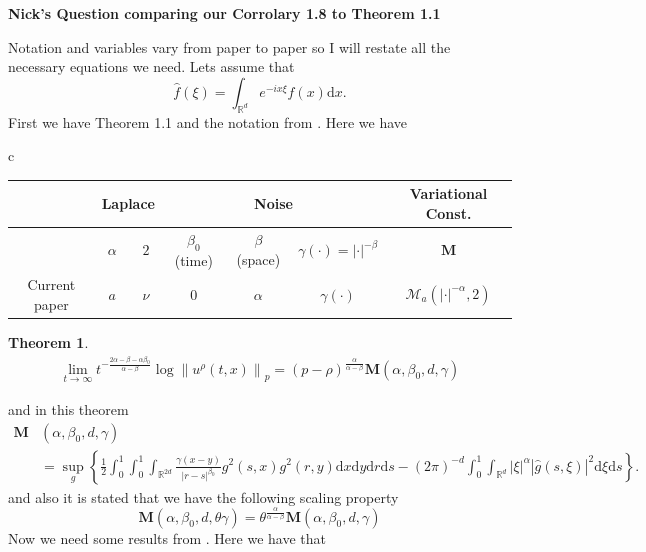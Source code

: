 \documentclass[a4paper,11pt]{article}
\numberwithin{equation}{section}
\theoremstyle{plain}
\newtheorem{theorem}{Theorem}[section]
\theoremstyle{definition}
\newcommand{\ud}{\ensuremath{\mathrm{d} }}
\newcommand{\Norm}[1]{\left\|  #1   \right\|}
\newcommand{\R}{\mathbb{R}}
\newcounter{NQ}
\newenvironment{NickQuestion}[1][] %
{\refstepcounter{NQ}
	\begin{mdframed}[backgroundcolor=lightgray]\textbf{Nick's Question \theNQ \: #1~~}~~~\noindent}%
	{\end{mdframed}}
\numberwithin{NQ}{section}
\numberwithin{LQ}{section}
\numberwithin{ZQ}{section}
\begin{document}
	\begin{NickQuestion}[comparing our Corrolary 1.8 to \cite{CHSS18} Theorem 1.1]

Notation and variables vary from paper to paper so I will restate all the necessary equations we need. Lets assume that
	\[
		\hat{f}(\xi) = \int_{\R^d} e^{-i x \xi}f(x) \ud x.
	\]
First we have Theorem 1.1 and the notation from \cite{CHSS18}. Here we have

	\begin{tabular}{c}
		\renewcommand{\arraystretch}{1.2}
		\begin{tabular}{|c|c|c|c|c|c|c|}
			\hline
			& \multicolumn{2}{c|}{Laplace} & \multicolumn{3}{c|}{Noise}    & Variational Const.  \\ \hline
			\cite{CHSS18}  & $\alpha$                      & $2$                        &  $\beta_0$ (time) & $\beta$ (space) & $\gamma(\cdot)=|\cdot|^{-\beta}$    & $\textbf{M}$                                \\
			Current paper                 & $a$                          & $\nu$           &      0     & $\alpha$ & $\gamma(\cdot)$                  & $\mathcal{M}_a\left(|\cdot|^{-\alpha},2\right)$ \\ \hline
		\end{tabular}
	\end{tabular}


	\begin{theorem}
		\begin{align*}
			\lim_{t \to \infty} t^{-\frac{2\alpha - \beta - \alpha \beta_0}{\alpha - \beta}} \log \Norm{u^{\rho}(t,x)}_p = (p-\rho)^{\frac{\alpha}{\alpha-\beta}}\textbf{M}(\alpha,\beta_0,d,\gamma)
		\end{align*}
	\end{theorem}
and in this theorem
		\begin{align*}
			\textbf{M} & (\alpha, \beta_0, d, \gamma)
			\\& = \sup_{g} \left\{ \frac{1}{2} \int_0^1 \int_0^1 \int_{\R^{2d}} \frac{\gamma(x-y)}{|r-s|^{\beta_0}} g^2(s,x)g^2(r,y) \ud x \ud y \ud r \ud s - (2\pi)^{-d}\int_0^1 \int_{\R^d} |\xi|^\alpha |\hat{g}(s,\xi)|^2 \ud \xi \ud s  \right\}.
		\end{align*}
and also it is stated that we have the following scaling property
	\[
		\textbf{M} (\alpha, \beta_0, d, \theta\gamma) = \theta^{\frac{\alpha}{\alpha - \beta}}\textbf{M}  (\alpha, \beta_0, d, \gamma)
	\]
Now we need some results from \cite{15AIHP}. Here we have that


\end{NickQuestion}
\end{document}
